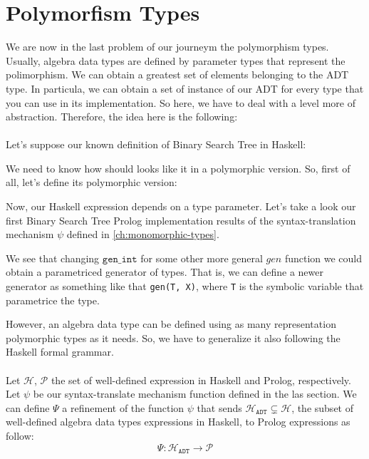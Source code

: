 \documentclass{report}
\theoremstyle{definition}
\theoremstyle{definition}
\newcommand{\ttt}[1]{\texttt{#1}}
\begin{document}
\section{Polymorfism Types}
We are now in the last problem of our journeym the polymorphism types. Usually, algebra data types are defined by parameter types that represent the polimorphism. We can obtain a greatest set of elements belonging to the ADT type. In particula, we can obtain a set of instance of our ADT for every type that you can use in its implementation. So here, we have to deal with a level more of abstraction. Therefore, the idea here is the following:\\\\
Let's suppose our known definition of Binary Search Tree in Haskell:

We need to know how should looks like it in a polymorphic version. So, first of all, let's define its polymorphic version:

Now, our Haskell expression depends on a type parameter. Let's take a look our first Binary Search Tree Prolog implementation results of the syntax-translation mechanism $\psi$ defined in \ref{ch:monomorphic-types}.

We see that changing $\ttt{gen\_int}$ for some other more general $gen$ function we could obtain a parametriced generator of types. That is, we can define a newer generator as something like that \ttt{gen(T, X)}, where \ttt{T} is the symbolic variable that parametrice the type.

However, an algebra data type can be defined using as many representation polymorphic types as it needs. So, we have to generalize it also following the Haskell formal grammar.\\\\
Let $\mathcal{H}$, $\mathcal{P}$ the set of well-defined expression in Haskell and Prolog, respectively. Let $\psi$ be our syntax-translate mechanism function defined in the las section. We can define $\Psi$ a refinement of the function $\psi$ that sends $\mathcal{H}_{\ttt{ADT}} \subsetneq \mathcal{H}$, the subset of well-defined algebra data types expressions in Haskell, to Prolog expressions as follow: $$\Psi: \mathcal{H}_{\ttt{ADT}} \longrightarrow \mathcal{P} $$
\end{document}
